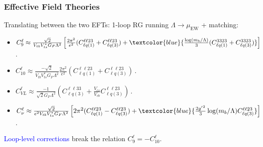 \documentclass[mathserif, 10pt]{beamer}
\begin{document}
\begin{frame}
    \frametitle{Effective Field Theories}
    Translating between the two EFTs: 1-loop RG running $\Lambda \to \mu_\mathrm{EW}$ + matching:
    \begin{itemize}
        \item {\small $C_9^\ell \approx \frac{\sqrt{2}}{V_{tb}V_{ts}^* G_F \Lambda^2}\left[ \frac{2\pi^2}{e^2}(C_{\ell q(1)}^{\ell\ell23}+C_{\ell q(3)}^{\ell\ell23}) + \textcolor{blue}{\frac{\log(m_b/\Lambda)}{3}(C_{\ell q(1)}^{3323}+C_{\ell q(3)}^{3323})}\right]\, $.}
        \item {\small $C_{10}^\ell \approx \frac{-\sqrt{2}}{V_{tb}V_{ts}^* G_F \Lambda^2} \frac{2\pi^2}{e^2}(C_{\ell q(1)}^{\ell\ell23}+C_{\ell q(3)}^{\ell\ell23}) \, $.}
\item {\small $C_{VL}^\ell \approx \frac{-1}{\sqrt{2}G_F\Lambda^2}\left(C_{\ell q(3)}^{\ell\ell33}+ \frac{V_{cs}}{V_{cb}}C_{\ell q(3)}^{\ell\ell 23}\right)$\,.}
        \item {\small $C_\nu^\ell \approx \frac{\sqrt{2}}{e^2 V_{tb}V_{ts}^* G_F \Lambda^2}\left[2\pi^2(C_{\ell q(1)}^{\ell\ell 23}-C_{\ell q(3)}^{\ell\ell 23})+\textcolor{blue}{\frac{2{g'}^2}{3}\log(m_b/\Lambda)C_{\ell q(3)}^{\ell\ell 23}}\right]\,$.}
    \end{itemize}

\textcolor{blue}{Loop-level corrections} break the relation $C_9^\ell = -C_{10}^\ell$.
\end{frame}
\end{document}
